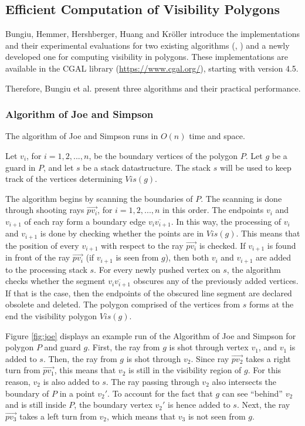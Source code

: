 \subsection{Efficient Computation of Visibility Polygons}
Bungiu, Hemmer, Hershberger, Huang and Kr\"oller  \cite{DBLP:journals/corr/BungiuHHHK14} introduce the implementations and their experimental evaluations for two existing algorithms (\cite{joe1987corrections}, \cite{asano1985efficient}) and a newly developed one for computing visibility in polygons. These implementations are available in the CGAL library (\url{https://www.cgal.org/}), starting with version 4.5.


Therefore, Bungiu et al. present three algorithms and their practical performance.

\subsubsection{Algorithm of Joe and Simpson}
The algorithm of Joe and Simpson \cite{joe1987corrections} runs in $O(n)$ time and space. 

Let $v_i$, for $i = {1, 2, ..., n}$, be the boundary vertices of the polygon $P$. Let $g$ be a guard in $P$, and let $s$ be a stack datastructure. The stack $s$ will be used to keep track of the vertices determining $\mathit{Vis}(g)$. 

The algorithm begins by scanning the boundaries of $P$. The scanning is done through shooting rays $\vec{pv_i}$, for $i = {1, 2, ..., n}$ in this order. The endpoints $v_i$ and $v_{i + 1}$ of each ray form a boundary edge $\overline{v_iv_{i + 1}}$. In this way, the processing of $v_i$ and $v_{i + 1}$ is done by checking whether the points are in $\mathit{Vis}(g)$. This means that the position of every $v_{i + 1}$ with respect to the ray $\vec{pv_i}$ is checked. If $v_{i + 1}$ is found in front of the ray $\vec{pv_i}$ (if $v_{i + 1}$ is seen from $g$), then both $v_i$ and $v_{i + 1}$ are added to the processing stack $s$. For every newly pushed vertex on $s$, the algorithm checks whether the segment $\overline{v_iv_{i + 1}}$ obscures any of the previously added vertices. If that is the case, then the endpoints of the obscured line segment are declared obsolete and deleted. The polygon comprised of the vertices from $s$ forms at the end the visibility polygon $\mathit{Vis}(g)$.

Figure \ref{fig:joe} displays an example run of the Algorithm of Joe and Simpson \cite{joe1987corrections} for polygon $P$ and guard $g$. First, the ray from $g$ is shot through vertex $v_1$, and $v_1$ is added to $s$. Then, the ray from $g$ is shot through $v_2$. Since ray $\vec{pv_2}$ takes a right turn from $\vec{pv_1}$, this means that $v_2$ is still in the visibility region of $g$. For this reason, $v_2$ is also added to $s$. The ray passing through $v_2$ also intersects the boundary of $P$ in a point $v_2'$. To account for the fact that $g$ can see ``behind'' $v_2$ and is still inside $P$, the boundary vertex $v_2'$ is hence added to $s$. Next, the ray $\vec{pv_3}$ takes a left turn from $v_2$, which means that $v_3$ is not seen from $g$. 

